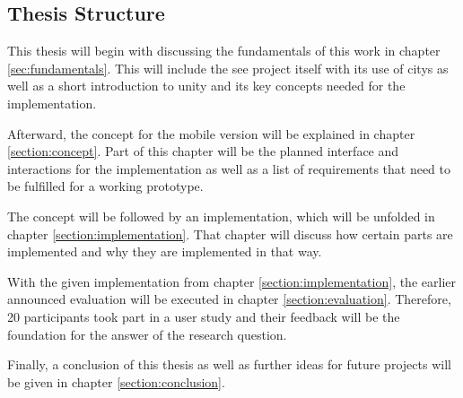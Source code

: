 \subsection{Thesis Structure}
This thesis will begin with discussing the fundamentals of this work in chapter \ref{sec:fundamentals}.
This will include the \gls{see} project itself with its use of \glspl{city} as well as a short introduction to \gls{unity} and its key concepts needed for the implementation.

Afterward, the concept for the mobile version will be explained in chapter \ref{section:concept}.
Part of this chapter will be the planned interface and interactions for the implementation as well as a list of requirements that need to be fulfilled for a working prototype.

The concept will be followed by an implementation, which will be unfolded in chapter \ref{section:implementation}.
That chapter will discuss how certain parts are implemented and why they are implemented in that way.

With the given implementation from chapter \ref{section:implementation}, the earlier announced evaluation will be executed in chapter \ref{section:evaluation}.
Therefore, 20 participants took part in a user study and their feedback will be the foundation for the answer of the research question.

Finally, a conclusion of this thesis as well as further ideas for future projects will be given in chapter \ref{section:conclusion}.